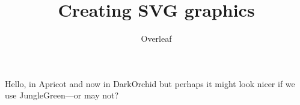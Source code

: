 \documentclass{article}
\title{Creating SVG graphics}
\author{Overleaf}
\begin{document}
	\maketitle
	Hello, {\color{Apricot}in Apricot} and now in {\color{DarkOrchid} DarkOrchid} but perhaps it might look nicer if we use {\color{JungleGreen}JungleGreen}---or may not?
\end{document}
